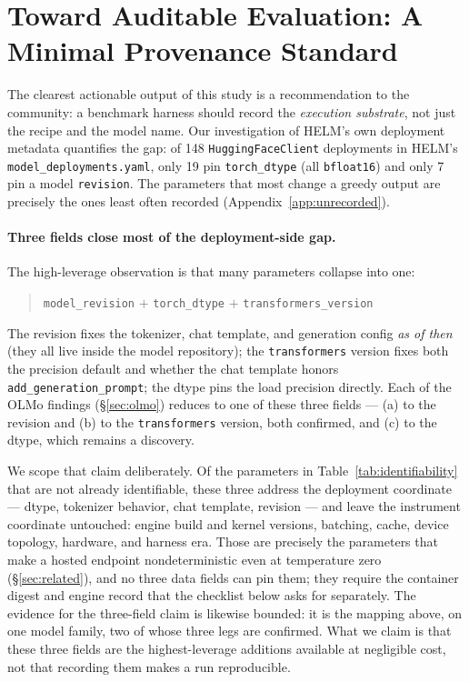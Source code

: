\section{Toward Auditable Evaluation: A Minimal Provenance Standard}
\label{sec:provenance}

The clearest actionable output of this study is a recommendation to the community:
a benchmark harness should record the \emph{execution substrate}, not just the
recipe and the model name. Our investigation of HELM's own deployment metadata
quantifies the gap: of 148 \texttt{HuggingFaceClient} deployments in HELM's
\texttt{model\_deployments.yaml}, only 19 pin \texttt{torch\_dtype} (all
\texttt{bfloat16}) and only 7 pin a model \texttt{revision}. The parameters that most
change a greedy output are precisely the ones least often recorded
(Appendix~\ref{app:unrecorded}).

\paragraph{Three fields close most of the deployment-side gap.} The high-leverage
observation is that many parameters collapse into one:
\begin{quote}
\texttt{model\_revision} $+$ \texttt{torch\_dtype} $+$ \texttt{transformers\_version}
\end{quote}
The revision fixes the tokenizer, chat template, and generation config \emph{as of
then} (they all live inside the model repository); the \texttt{transformers} version
fixes both the precision default and whether the chat template honors
\texttt{add\_generation\_prompt}; the dtype pins the load precision directly. Each of
the OLMo findings (\S\ref{sec:olmo}) reduces to one of these three fields --- (a)
to the revision and (b) to the \texttt{transformers} version, both confirmed, and
(c) to the dtype, which remains a discovery.

We scope that claim deliberately. Of the parameters in
Table~\ref{tab:identifiability} that are not already identifiable, these three
address the deployment coordinate --- dtype, tokenizer behavior, chat
template, revision --- and leave the instrument coordinate untouched: engine
build and kernel versions, batching, cache, device topology, hardware, and
harness era.
Those are precisely the parameters that make a hosted endpoint nondeterministic
even at temperature zero (\S\ref{sec:related}), and no three data fields can pin
them; they require the container digest and engine record that the checklist below
asks for separately. The evidence for the three-field claim is likewise bounded: it
is the mapping above, on one model family, two of whose three legs are confirmed.
What we claim is that these three fields are the highest-leverage additions
available at negligible cost, not that recording them makes a run reproducible.

